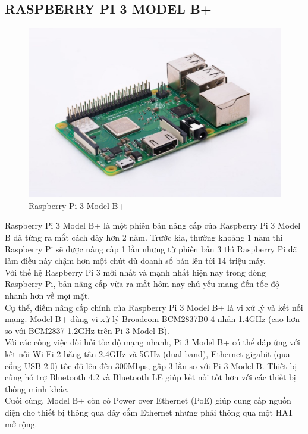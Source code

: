 \subsection{RASPBERRY PI 3 MODEL B+}
\begin{figure}[H]
	\centering
	\includegraphics[scale=.5]{Chapter 3/image chapter 3/rasp3.jpg}
	\caption[Raspberry Pi 3 Model B+ ]{Raspberry Pi 3 Model B+}
	\label{hinh33}
\end{figure}
Raspberry Pi 3 Model B+ là một phiên bản nâng cấp của Raspberry Pi 3 Model B đã từng ra mắt cách đây hơn 2 năm. Trước kia, thường khoảng 1 năm thì Raspberry Pi sẽ được nâng cấp 1 lần nhưng từ phiên bản 3 thì Raspberry Pi đã làm điều này chậm hơn một chút dù doanh số bán lên tới 14 triệu máy.\\
\indent Với thế hệ Raspberry Pi 3 mới nhất và mạnh nhất hiện nay trong dòng Raspberry Pi, bản nâng cấp vừa ra mắt hôm nay chủ yếu mang đến tốc độ nhanh hơn về mọi mặt.\\
\indent Cụ thể, điểm nâng cấp chính của Raspberry Pi 3 Model B+ là vi xử lý và kết nối mạng. Model B+ dùng vi xử lý Broadcom BCM2837B0 4 nhân 1.4GHz (cao hơn so với BCM2837 1.2GHz trên Pi 3 Model B).\\
\indent Với các công việc đòi hỏi tốc độ mạng nhanh, Pi 3 Model B+ có thể đáp ứng với kết nối Wi-Fi 2 băng tần 2.4GHz và 5GHz (dual band), Ethernet gigabit (qua cổng USB 2.0) tốc độ lên đến 300Mbps, gấp 3 lần so với Pi 3 Model B. Thiết bị cũng hỗ trợ Bluetooth 4.2 và Bluetooth LE giúp kết nối tốt hơn với các thiết bị thông minh khác.\\
\indent Cuối cùng, Model B+ còn có Power over Ethernet (PoE) giúp cung cấp nguồn điện cho thiết bị thông qua dây cắm Ethernet nhưng phải thông qua một HAT mở rộng.\\

